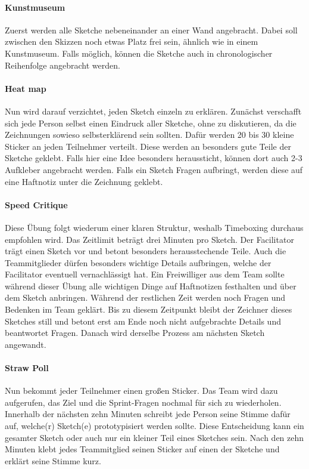 \paragraph{Kunstmuseum}
Zuerst werden alle Sketche nebeneinander an einer Wand angebracht. Dabei soll zwischen den Skizzen noch etwas Platz frei sein, ähnlich wie in einem Kunstmuseum. Falls möglich, können die Sketche auch in chronologischer Reihenfolge angebracht werden.

\paragraph{Heat map}
Nun wird darauf verzichtet, jeden Sketch einzeln zu erklären. Zunächst verschafft sich jede Person selbst einen Eindruck aller Sketche, ohne zu diskutieren, da die Zeichnungen sowieso selbsterklärend sein sollten. Dafür werden 20 bis 30 kleine Sticker an jeden Teilnehmer verteilt. Diese werden an besonders gute Teile der Sketche geklebt. Falls hier eine Idee besonders heraussticht, können dort auch 2-3 Aufkleber angebracht werden. Falls ein Sketch Fragen aufbringt, werden diese auf eine Haftnotiz unter die Zeichnung geklebt.

\paragraph{Speed Critique}
Diese Übung folgt wiederum einer klaren Struktur, weshalb Timeboxing durchaus empfohlen wird. Das Zeitlimit beträgt drei Minuten pro Sketch. Der Facilitator trägt einen Sketch vor und betont besonders herausstechende Teile. Auch die Teammitglieder dürfen besonders wichtige Details aufbringen, welche der Facilitator eventuell vernachlässigt hat. Ein Freiwilliger aus dem Team sollte während dieser Übung alle wichtigen Dinge auf Haftnotizen festhalten und über dem Sketch anbringen. Während der restlichen Zeit werden noch Fragen und Bedenken im Team geklärt. Bis zu diesem Zeitpunkt bleibt der Zeichner dieses Sketches still und betont erst am Ende noch nicht aufgebrachte Details und beantwortet Fragen. Danach wird derselbe Prozess am nächsten Sketch angewandt.

\paragraph{Straw Poll}
Nun bekommt jeder Teilnehmer einen großen Sticker. Das Team wird dazu aufgerufen, das Ziel und die Sprint-Fragen nochmal für sich zu wiederholen. Innerhalb der nächsten zehn Minuten schreibt jede Person seine Stimme dafür auf, welche(r) Sketch(e) prototypisiert werden sollte. Diese Entscheidung kann ein gesamter Sketch oder auch nur ein kleiner Teil eines Sketches sein. Nach den zehn Minuten klebt jedes Teammitglied seinen Sticker auf einen der Sketche und erklärt seine Stimme kurz.

